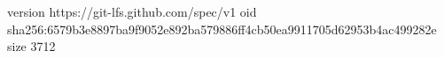 version https://git-lfs.github.com/spec/v1
oid sha256:6579b3e8897ba9f9052e892ba579886ff4cb50ea9911705d62953b4ac499282e
size 3712
